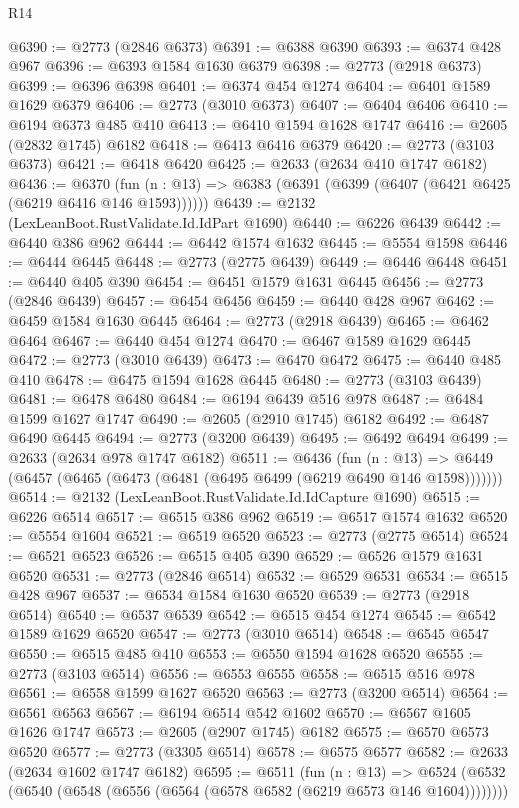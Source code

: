 \begin{lexlean}{R14}
\begin{coremodule}
@6390 := @2773 (@2846 @6373)
@6391 := @6388 @6390
@6393 := @6374 @428 @967
@6396 := @6393 @1584 @1630 @6379
@6398 := @2773 (@2918 @6373)
@6399 := @6396 @6398
@6401 := @6374 @454 @1274
@6404 := @6401 @1589 @1629 @6379
@6406 := @2773 (@3010 @6373)
@6407 := @6404 @6406
@6410 := @6194 @6373 @485 @410
@6413 := @6410 @1594 @1628 @1747
@6416 := @2605 (@2832 @1745) @6182
@6418 := @6413 @6416 @6379
@6420 := @2773 (@3103 @6373)
@6421 := @6418 @6420
@6425 := @2633 (@2634 @410 @1747 @6182)
@6436 := @6370
    (fun (n : @13) => @6383 (@6391 (@6399 (@6407 (@6421 @6425 (@6219 @6416 @146 @1593))))))
@6439 := @2132 (LexLeanBoot.RustValidate.Id.IdPart @1690)
@6440 := @6226 @6439
@6442 := @6440 @386 @962
@6444 := @6442 @1574 @1632
@6445 := @5554 @1598
@6446 := @6444 @6445
@6448 := @2773 (@2775 @6439)
@6449 := @6446 @6448
@6451 := @6440 @405 @390
@6454 := @6451 @1579 @1631 @6445
@6456 := @2773 (@2846 @6439)
@6457 := @6454 @6456
@6459 := @6440 @428 @967
@6462 := @6459 @1584 @1630 @6445
@6464 := @2773 (@2918 @6439)
@6465 := @6462 @6464
@6467 := @6440 @454 @1274
@6470 := @6467 @1589 @1629 @6445
@6472 := @2773 (@3010 @6439)
@6473 := @6470 @6472
@6475 := @6440 @485 @410
@6478 := @6475 @1594 @1628 @6445
@6480 := @2773 (@3103 @6439)
@6481 := @6478 @6480
@6484 := @6194 @6439 @516 @978
@6487 := @6484 @1599 @1627 @1747
@6490 := @2605 (@2910 @1745) @6182
@6492 := @6487 @6490 @6445
@6494 := @2773 (@3200 @6439)
@6495 := @6492 @6494
@6499 := @2633 (@2634 @978 @1747 @6182)
@6511 := @6436
    (fun (n : @13) => @6449 (@6457 (@6465 (@6473 (@6481 (@6495 @6499 (@6219 @6490 @146 @1598)))))))
@6514 := @2132 (LexLeanBoot.RustValidate.Id.IdCapture @1690)
@6515 := @6226 @6514
@6517 := @6515 @386 @962
@6519 := @6517 @1574 @1632
@6520 := @5554 @1604
@6521 := @6519 @6520
@6523 := @2773 (@2775 @6514)
@6524 := @6521 @6523
@6526 := @6515 @405 @390
@6529 := @6526 @1579 @1631 @6520
@6531 := @2773 (@2846 @6514)
@6532 := @6529 @6531
@6534 := @6515 @428 @967
@6537 := @6534 @1584 @1630 @6520
@6539 := @2773 (@2918 @6514)
@6540 := @6537 @6539
@6542 := @6515 @454 @1274
@6545 := @6542 @1589 @1629 @6520
@6547 := @2773 (@3010 @6514)
@6548 := @6545 @6547
@6550 := @6515 @485 @410
@6553 := @6550 @1594 @1628 @6520
@6555 := @2773 (@3103 @6514)
@6556 := @6553 @6555
@6558 := @6515 @516 @978
@6561 := @6558 @1599 @1627 @6520
@6563 := @2773 (@3200 @6514)
@6564 := @6561 @6563
@6567 := @6194 @6514 @542 @1602
@6570 := @6567 @1605 @1626 @1747
@6573 := @2605 (@2907 @1745) @6182
@6575 := @6570 @6573 @6520
@6577 := @2773 (@3305 @6514)
@6578 := @6575 @6577
@6582 := @2633 (@2634 @1602 @1747 @6182)
@6595 := @6511
    (fun (n : @13) =>
    @6524 (@6532 (@6540 (@6548 (@6556 (@6564 (@6578 @6582 (@6219 @6573 @146 @1604))))))))

\end{coremodule}
\end{lexlean}
